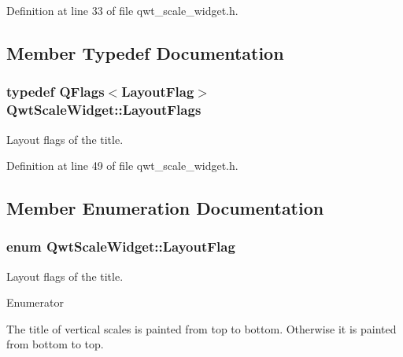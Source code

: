 Definition at line 33 of file qwt\-\_\-scale\-\_\-widget.\-h.



\subsection{Member Typedef Documentation}
\hypertarget{class_qwt_scale_widget_a19dcd8adcfd10fe26e021fa47e22b843}{
\subsubsection[{Layout\-Flags}]{\setlength{\rightskip}{0pt plus 5cm}typedef Q\-Flags$<${\bf Layout\-Flag}$>$ {\bf Qwt\-Scale\-Widget\-::\-Layout\-Flags}}}\label{class_qwt_scale_widget_a19dcd8adcfd10fe26e021fa47e22b843}


Layout flags of the title. 



Definition at line 49 of file qwt\-\_\-scale\-\_\-widget.\-h.



\subsection{Member Enumeration Documentation}
\hypertarget{class_qwt_scale_widget_a95903255246c9da84e7388b567354c8f}{
\subsubsection[{Layout\-Flag}]{\setlength{\rightskip}{0pt plus 5cm}enum {\bf Qwt\-Scale\-Widget\-::\-Layout\-Flag}}}\label{class_qwt_scale_widget_a95903255246c9da84e7388b567354c8f}


Layout flags of the title. 

\begin{Desc}
\item[Enumerator]\par
\begin{description}
\item[{\em 
\hypertarget{class_qwt_scale_widget_a95903255246c9da84e7388b567354c8fac6160b1d9f11f92db884ff26da8e2637}{Title\-Inverted}\label{class_qwt_scale_widget_a95903255246c9da84e7388b567354c8fac6160b1d9f11f92db884ff26da8e2637}
}]The title of vertical scales is painted from top to bottom. Otherwise it is painted from bottom to top. \end{description}
\end{Desc}


